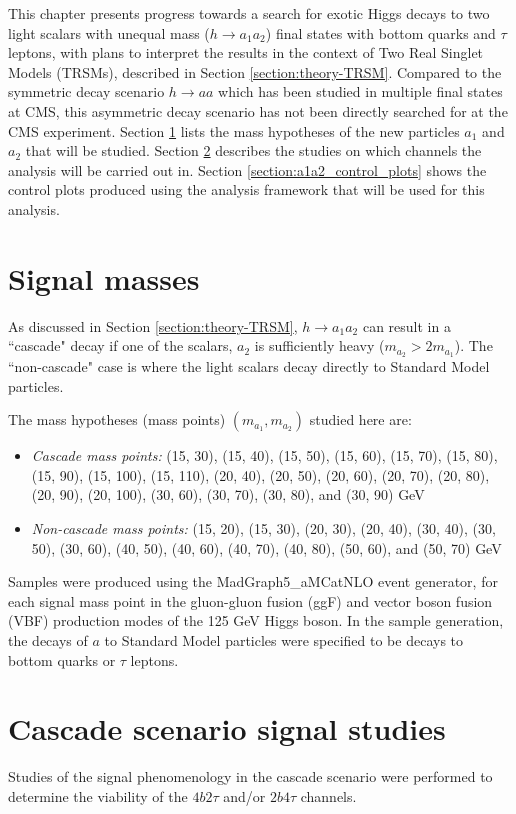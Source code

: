 This chapter presents progress towards a search for exotic Higgs decays to two light scalars with unequal mass ($h \rightarrow a_1 a_2$) final states with bottom quarks and $\tau$ leptons, with plans to interpret the results in the context of Two Real Singlet Models (TRSMs), described in Section \ref{section:theory-TRSM}.  Compared to the symmetric decay scenario $h\rightarrow aa$ which has been studied in multiple final states at CMS, this asymmetric decay scenario has not been directly searched for at the CMS experiment. Section \ref{section:a1a2_masses} lists the mass hypotheses of the new particles $a_1$ and $a_2$ that will be studied. Section \ref{section:a1a2_gen_studies} describes the studies on which channels the analysis will be carried out in. Section \ref{section:a1a2_control_plots} shows the control plots produced using the analysis framework that will be used for this analysis.

\section{Signal masses}
\label{section:a1a2_masses}
As discussed in Section \ref{section:theory-TRSM}, $h \rightarrow a_1 a_2$ can result in a ``cascade" decay if one of the scalars, $a_2$ is sufficiently heavy ($m_{a_2} > 2m_{a_1}$). The ``non-cascade" case is where the light scalars decay directly to Standard Model particles. 

The mass hypotheses (mass points) $(m_{a_1}, m_{a_2})$ studied here are:
\begin{itemize}
    \item \textit{Cascade mass points:} (15, 30), (15, 40), (15, 50), (15, 60), (15, 70), (15, 80), (15, 90), (15, 100), (15, 110), (20, 40), (20, 50), (20, 60), (20, 70), (20, 80), (20, 90), (20, 100), (30, 60), (30, 70), (30, 80), and (30, 90) GeV
    \item \textit{Non-cascade mass points:} (15, 20), (15, 30), (20, 30), (20, 40), (30, 40), (30, 50), (30, 60), (40, 50), (40, 60), (40, 70), (40, 80), (50, 60), and (50, 70) GeV
\end{itemize}
Samples were produced using the MadGraph5\_aMCatNLO event generator, for each signal mass point in the gluon-gluon fusion (ggF) and vector boson fusion (VBF) production modes of the 125 GeV Higgs boson. In the sample generation, the decays of $a$ to Standard Model particles were specified to be decays to bottom quarks or $\tau$ leptons.


\section{Cascade scenario signal studies}
\label{section:a1a2_gen_studies}
Studies of the signal phenomenology in the cascade scenario were performed to determine the viability of the $4b2\tau$ and/or $2b4\tau$ channels. 

